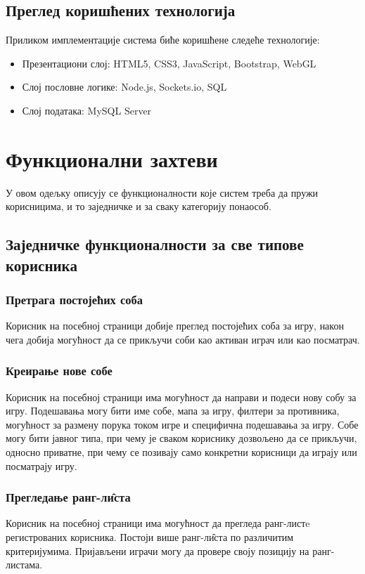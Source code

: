 \subsection{Преглед коришћених технологија}
Приликом имплементације система биће коришћене следеће технологије:
\begin{itemize}
    \item Презентациони слој: HTML5, CSS3, JavaScript, Bootstrap, WebGL
    \item Слој пословне логике: Node.js, Sockets.io, SQL
    \item Слој података: MySQL Server
\end{itemize}



\section{Функционални захтеви} 
У овом одељку описују се функционалности које систем треба да пружи корисницима, и то заједничке и за сваку
категорију понаособ.

\subsection{Заједничке функционалности за све типове корисника}

\subsubsection{Претрага постојећих соба}
Корисник на посебној страници добије преглед постојећих соба за игру, након чега добија могућност да се 
прикључи соби као активан играч или као посматрач.

\subsubsection{Креирање нове собе}
Корисник на посебној страници има могућност да направи и подеси нову собу за игру. Подешавања могу бити име собе,
мапа за игру, филтери за противника, могућност за размену порука током игре и специфична подешавања за игру. 
Собе могу бити јавног типа, при чему је сваком кориснику дозвољено да се прикључи, односно приватне, 
при чему се позивају само конкретни корисници да играју или посматрају игру.

\subsubsection{Прегледање ранг-л\^{и}ста}
Корисник на посебној страници има могућност да прегледа ранг-листe регистрованих корисника.
Постоји више ранг-л\^{и}ста по различитим критеријумима. Пријављени играчи могу да провере своју позицију
на ранг-листама.

